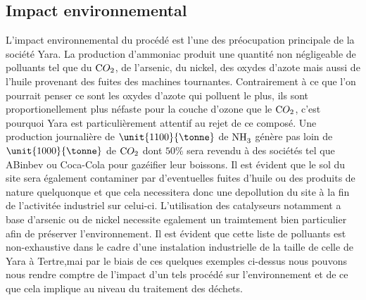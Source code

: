 \subsection*{Impact environnemental}
L'impact environnemental du procédé est l'une des préocupation principale
de la société Yara. La production d'ammoniac produit une quantité non négligeable de 
polluants tel que du $\ce CO_2$, de l'arsenic, du nickel, des oxydes d'azote
mais aussi de l'huile provenant des fuites des machines tournantes. 
Contrairement à ce que l'on pourrait penser ce sont les oxydes d'azote
qui polluent le plus, ils sont proportionellement plus néfaste pour la couche 
d'ozone que le $\ce CO_2$, c'est pourquoi Yara est particulièrement attentif au rejet 
de ce composé. Une production journalière de $\unit {1100}{\tonne}$ de $\ce {NH_3}$ génère pas loin de 
$\unit {1000}{\tonne}$ de $\ce CO_2$ dont $50 \%$ sera revendu à des sociétés
tel que ABinbev ou Coca-Cola pour gazéifier leur boissons. Il est évident
que le sol du site sera également contaminer par d'eventuelles fuites d'huile 
ou des produits de nature quelquonque et que cela necessitera donc une depollution du site à 
la fin de l'activitée industriel sur celui-ci. L'utilisation des catalyseurs notamment a base d'arsenic ou de nickel necessite egalement un traimtement 
bien particulier afin de préserver l'environnement. Il est évident que cette liste de polluants est non-exhaustive dans le cadre d'une instalation industrielle 
de la taille de celle de Yara à Tertre,mai par le biais de ces quelques exemples ci-dessus nous pouvons nous rendre comptre de l'impact d'un tels procédé
sur l'environnement et de ce que cela implique au niveau du traitement des déchets.
